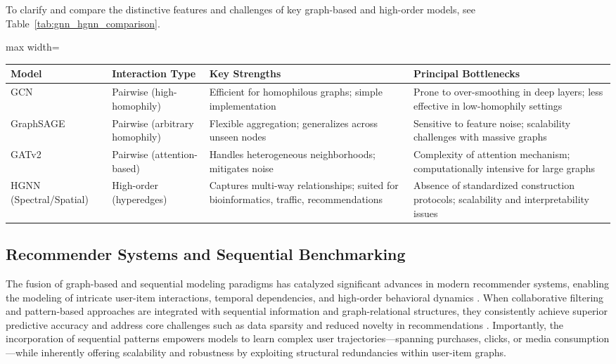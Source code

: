 To clarify and compare the distinctive features and challenges of key graph-based and high-order models, see Table~\ref{tab:gnn_hgnn_comparison}.

\begin{table*}[htbp]
\centering
\caption{Comparison of Key Graph Neural and Hypergraph Neural Architectures}
\label{tab:gnn_hgnn_comparison}
\begin{adjustbox}{max width=\textwidth}
\begin{tabular}{llll}
\toprule
\textbf{Model} & \textbf{Interaction Type} & \textbf{Key Strengths} & \textbf{Principal Bottlenecks} \\
\midrule
GCN & Pairwise (high-homophily) & Efficient for homophilous graphs; simple implementation & Prone to over-smoothing in deep layers; less effective in low-homophily settings \\
GraphSAGE & Pairwise (arbitrary homophily) & Flexible aggregation; generalizes across unseen nodes & Sensitive to feature noise; scalability challenges with massive graphs \\
GATv2 & Pairwise (attention-based) & Handles heterogeneous neighborhoods; mitigates noise & Complexity of attention mechanism; computationally intensive for large graphs \\
HGNN (Spectral/Spatial) & High-order (hyperedges) & Captures multi-way relationships; suited for bioinformatics, traffic, recommendations & Absence of standardized construction protocols; scalability and interpretability issues \\
\bottomrule
\end{tabular}
\end{adjustbox}
\end{table*}

\subsection{Recommender Systems and Sequential Benchmarking}

The fusion of graph-based and sequential modeling paradigms has catalyzed significant advances in modern recommender systems, enabling the modeling of intricate user-item interactions, temporal dependencies, and high-order behavioral dynamics \cite{ref84}. When collaborative filtering and pattern-based approaches are integrated with sequential information and graph-relational structures, they consistently achieve superior predictive accuracy and address core challenges such as data sparsity and reduced novelty in recommendations \cite{ref84}. Importantly, the incorporation of sequential patterns empowers models to learn complex user trajectories—spanning purchases, clicks, or media consumption—while inherently offering scalability and robustness by exploiting structural redundancies within user-item graphs.

